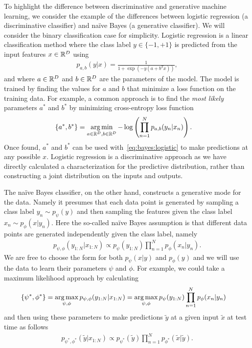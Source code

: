 To highlight the difference between discriminative and generative machine learning, we consider the
example of the differences between logistic regression (a discriminative classifier) and na\"{i}ve Bayes 
(a generative classifier).  We will consider the binary classification case for simplicity.  Logistic regression is a linear
classification method where the class label $y \in \{-1,+1\}$ is predicted from the input features $x \in \mathbb{R}^D$ using
\begin{align}
\label{eq:bayes:logistic}
p_{a,b}(y|x) = \frac{1}{1+\exp(-y(a+b^Tx))},
\end{align}
and where $a \in \mathbb{R}^D$ and $b \in \mathbb{R}^D$ are the parameters of the model.  The model is trained by finding the values
for $a$ and $b$ that minimize a loss function on the training data.  For example, a common approach
is to find the \emph{most likely} parameters $a^*$ and $b^*$ by minimizing cross-entropy loss function
\begin{align}
\{a^*,b^*\} &= \operatorname*{arg\,min}_{a\in \mathbb{R}^D,b\in \mathbb{R}^D} -\log \left(\prod_{n=1}^{N} p_{a,b}(y_n|x_n)\right).
\end{align}
Once found, $a^*$ and $b^*$ can be used with~\eqref{eq:bayes:logistic} to make predictions at
any possible $x$.  Logistic regression is a discriminative approach as we have directly calculated
a characterization for the predictive distribution, rather than constructing a joint distribution
on the inputs and outputs.

The na\"{i}ve Bayes classifier, on the other hand, constructs a generative mode for the data. Namely
it presumes that each data point is generated by sampling a class label $y_n \sim p_{\psi}(y)$ and then sampling
the features given the class label $x_n \sim p_{\phi}(x|y_n)$.  Here the so-called na\"{i}ve Bayes assumption
is that different data points are generated independently given the class label, namely
\begin{align}
p_{\psi,\phi}(y_{1:N} | x_{1:N}) \propto p_{\psi}(y_{1:N})\prod_{n=1}^{N} p_{\phi}(x_n | y_n).
\end{align}
We are free to choose the form for both $p_{\psi}(x | y)$ and $p_{\phi}(y)$ %
and we will use the data to learn their parameters $\psi$ and $\phi$.  For example, we could take a maximum
likelihood approach by calculating
\begin{align}
\{\psi^*,\phi^*\} &= \operatorname*{arg\,max}_{\psi,\phi}  p_{\psi,\phi}(y_{1:N} | x_{1:N}) 
= \operatorname*{arg\,max}_{\psi,\phi}  p_{\psi}(y_{1:N})\prod_{n=1}^{N} p_{\phi}(x_n | y_n)
\end{align}
and then using these parameters to make predictions $\tilde{y}$ at a given input $\tilde{x}$ at test time as follows
\begin{align}
p_{\psi^*,\phi^*}(\tilde{y} | x_{1:N}) \propto p_{\psi^*}(\tilde{y})\prod_{n=1}^{N} p_{\phi^*}(\tilde{x} | \tilde{y}).
\end{align}

